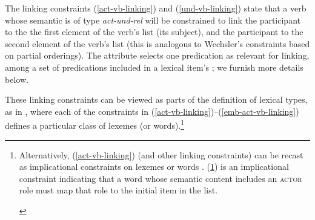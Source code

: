 \documentclass[output=paper,biblatex,babelshorthands,newtxmath,draftmode,colorlinks, citecolor=brown]{langscibook}
\begin{document}
The linking constraints (\ref{act-vb-linking}) and (\ref{und-vb-linking}) state that 
a verb whose semantic \content is of type \emph{act-und-rel} will be constrained to link the
 participant to the the first element of the verb's \argst list (its subject), and the
 participant to the second element of the verb's \argst list (this is analogous to
Wechsler's constraints based on partial orderings).
 The attribute  selects
one predication as relevant for linking, among a set of predications included in a lexical item's
; we furnish more details below. 

These linking constraints can be viewed as parts of the definition of lexical types, as in
\citet{Davis2001}, where each of the constraints in
(\ref{act-vb-linking})--(\ref{emb-act-vb-linking}) defines a particular class of lexemes (or
words).\footnote{Alternatively, (\ref{act-vb-linking}) (and other linking constraints) can be recast
  as implicational constraints on lexemes or words \citep{KoenigandDavis2003}.
  (\ref{act-vb-linking-alt}) is an implicational constraint indicating that a word whose semantic
  content includes an \textsc{actor} role must map that role to the initial item in the \argst list.

\begin{exe}
\ex\label{act-vb-linking-alt}
 \impl {}
\end{exe} 
}   

\begin{exe}
	\ex\label{act-vb-linking}
\end{exe}

\begin{exe}
	\ex\label{und-vb-linking}
\end{exe}

\begin{exe}
	\ex\label{emb-act-vb-linking}
\end{exe}
\end{document}
